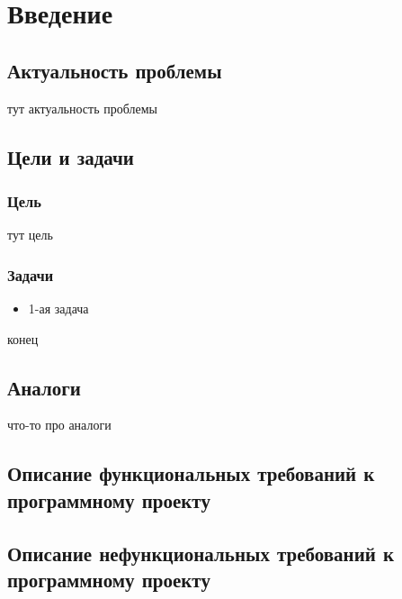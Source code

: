 \section{Введение}

\subsection{Актуальность проблемы}
тут актуальность проблемы 

\subsection{Цели и задачи}
\subsubsection{Цель}
тут цель
\subsubsection{Задачи}
\begin{itemize}
\item 1-ая задача
\end{itemize}
конец
\subsection{Аналоги}
что-то про аналоги
\subsection{Описание функциональных требований к программному проекту}

\subsection{Описание нефункциональных требований к программному проекту}